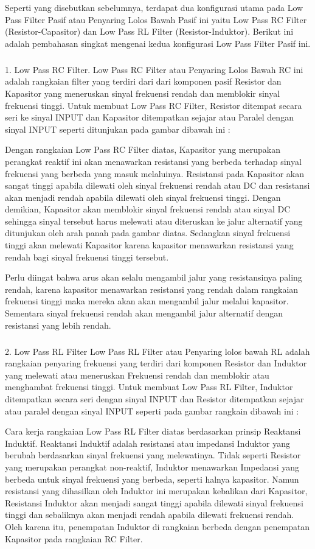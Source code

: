 \documentclass[12pt,a4paper]{article}
\begin{document}
Seperti yang disebutkan sebelumnya, terdapat dua konfigurasi utama pada Low Pass Filter Pasif atau Penyaring Lolos Bawah Pasif ini yaitu Low Pass RC Filter (Resistor-Capasitor) dan Low Pass RL Filter (Resistor-Induktor). Berikut ini adalah pembahasan singkat mengenai kedua konfigurasi Low Pass Filter Pasif ini.

\subparagraph{ }
1. Low Pass RC Filter.
Low Pass RC Filter atau Penyaring Lolos Bawah RC ini adalah rangkaian filter yang terdiri dari dari komponen pasif Resistor dan Kapasitor yang meneruskan sinyal frekuensi rendah dan memblokir sinyal frekuensi tinggi. Untuk membuat Low Pass RC Filter, Resistor ditempat secara seri ke sinyal INPUT dan Kapasitor ditempatkan sejajar atau Paralel dengan sinyal INPUT seperti ditunjukan pada gambar dibawah ini :

Dengan rangkaian Low Pass RC Filter diatas, Kapasitor yang merupakan perangkat reaktif ini akan menawarkan resistansi yang berbeda terhadap sinyal frekuensi yang berbeda yang masuk melaluinya. Resistansi pada Kapasitor akan sangat tinggi apabila dilewati oleh sinyal frekuensi rendah atau DC dan resistansi akan menjadi rendah apabila dilewati oleh sinyal frekuensi tinggi. Dengan demikian,  Kapasitor akan memblokir sinyal frekuensi rendah atau sinyal DC sehingga sinyal tersebut harus melewati atau diteruskan ke jalur alternatif yang ditunjukan oleh arah panah pada gambar diatas. Sedangkan sinyal frekuensi tinggi akan melewati Kapasitor karena kapasitor menawarkan resistansi yang rendah bagi sinyal frekuensi tinggi tersebut.

Perlu diingat bahwa arus akan selalu mengambil jalur yang resistansinya paling rendah, karena kapasitor menawarkan resistansi yang rendah dalam rangkaian frekuensi tinggi maka mereka akan akan mengambil jalur melalui kapasitor. Sementara sinyal frekuensi rendah akan mengambil jalur alternatif dengan resistansi yang lebih rendah.

\subparagraph{ }
2. Low Pass RL Filter
Low Pass RL Filter atau Penyaring lolos bawah RL adalah rangkaian penyaring frekuensi yang terdiri dari komponen Resistor dan Induktor yang melewati atau meneruskan Frekuensi rendah dan memblokir atau menghambat frekuensi tinggi. Untuk membuat Low Pass RL Filter, Induktor ditempatkan secara seri dengan sinyal INPUT dan Resistor ditempatkan sejajar atau paralel dengan sinyal INPUT seperti pada gambar rangkain dibawah ini :

Cara kerja rangkaian Low Pass RL Filter diatas berdasarkan prinsip Reaktansi Induktif. Reaktansi Induktif adalah resistansi atau impedansi Induktor yang berubah berdasarkan sinyal frekuensi yang melewatinya. Tidak seperti Resistor yang merupakan perangkat non-reaktif, Induktor menawarkan Impedansi yang berbeda untuk sinyal frekuensi yang berbeda, seperti halnya kapasitor. Namun resistansi yang dihasilkan oleh Induktor ini merupakan kebalikan dari Kapasitor, Resistansi Induktor akan menjadi sangat tinggi apabila dilewati sinyal frekuensi tinggi dan sebaliknya akan menjadi rendah apabila dilewati frekuensi rendah. Oleh karena itu, penempatan Induktor di rangkaian berbeda dengan penempatan Kapasitor pada rangkaian RC Filter.
\end{document}
